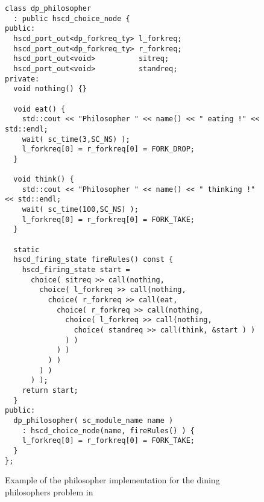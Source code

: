 \begin{figure}
\centering
\begin{verbatim}
class dp_philosopher
  : public hscd_choice_node {
public:
  hscd_port_out<dp_forkreq_ty> l_forkreq;
  hscd_port_out<dp_forkreq_ty> r_forkreq;
  hscd_port_out<void>          sitreq;
  hscd_port_out<void>          standreq;
private:
  void nothing() {}
  
  void eat() {
    std::cout << "Philosopher " << name() << " eating !" << std::endl;
    wait( sc_time(3,SC_NS) );
    l_forkreq[0] = r_forkreq[0] = FORK_DROP;
  }
  
  void think() {
    std::cout << "Philosopher " << name() << " thinking !" << std::endl;
    wait( sc_time(100,SC_NS) );
    l_forkreq[0] = r_forkreq[0] = FORK_TAKE; 
  }
  
  static
  hscd_firing_state fireRules() const {
    hscd_firing_state start =
      choice( sitreq >> call(nothing,
        choice( l_forkreq >> call(nothing,
          choice( r_forkreq >> call(eat,
            choice( r_forkreq >> call(nothing,
              choice( l_forkreq >> call(nothing,
                choice( standreq >> call(think, &start ) )
              ) )
            ) )
          ) )
        ) )
      ) );
    return start;
  }
public:
  dp_philosopher( sc_module_name name )
    : hscd_choice_node(name, fireRules() ) {
    l_forkreq[0] = r_forkreq[0] = FORK_TAKE; 
  }
};
\end{verbatim}
\caption{\label{dining-philosophers-csp-systemoc}
  Example of the philosopher implementation for the
  dining philosophers problem in \SysteMoC{}}
\end{figure}

